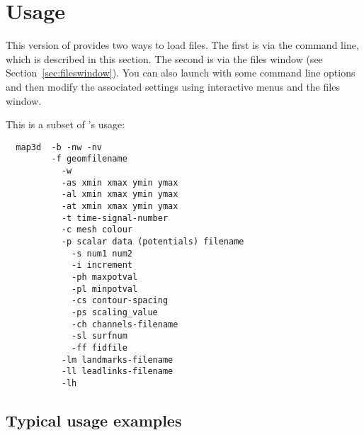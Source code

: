 \section{Usage} 
\label{sec:usage}

This version of \map{} provides two ways to load files.  The first is 
via the command line, which is described in this section.  The second is
via the files window (see Section~\ref{sec:fileswindow}).  You can also
launch \map{} with some command line options and then modify the associated
settings using interactive menus and the files window.  

This is a subset of \map{}'s usage:
\begin{verbatim} 
  map3d  -b -nw -nv
         -f geomfilename 
           -w
           -as xmin xmax ymin ymax 
           -al xmin xmax ymin ymax
           -at xmin xmax ymin ymax 
           -t time-signal-number 
           -c mesh colour
           -p scalar data (potentials) filename 
             -s num1 num2 
             -i increment 
             -ph maxpotval 
             -pl minpotval 
             -cs contour-spacing 
             -ps scaling_value 
             -ch channels-filename 
             -sl surfnum
             -ff fidfile
           -lm landmarks-filename
           -ll leadlinks-filename
           -lh 
\end{verbatim}

\subsection{Typical usage examples}
\label{sec:usage-examples} 

